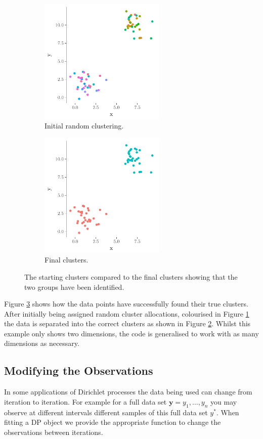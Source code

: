 \documentclass[nojss]{jss}
\begin{document}
\begin{figure}[tb]
	\begin{subfigure}[t]{0.5\textwidth}
	\includegraphics[height=60mm, width=60mm]{img/clustering_initial_plot.pdf}
	\caption{Initial random clustering.}
	\label{fig:clusteringA}
	\end{subfigure}
	\begin{subfigure}[t]{0.5\textwidth}
	\includegraphics[height=60mm, width=60mm]{img/clustering_fit_plot.pdf}
	\caption{Final clusters.}
		\label{fig:clusteringB}
	\end{subfigure}
	\caption{The starting clusters compared to the final clusters showing that the two groups have been identified.}
	\label{fig:clustering}
\end{figure}
Figure \ref{fig:clustering} shows how the data points have successfully found their true clusters. After initially being assigned random cluster allocations, colourised in Figure \ref{fig:clusteringA} the data is separated into the correct clusters as shown in Figure \ref{fig:clusteringB}. Whilst this example only shows two dimensions, the code is generalised to work with as many dimensions as necessary.


\subsection{Modifying the Observations}
In some applications of Dirichlet processes the data being used can change from iteration to iteration. For example for a full data set $\mathbf{y} = y_1 , \ldots , y_n$ you may observe at different intervals different samples of this full data set $y^*$. When fitting a DP object we provide the appropriate function  to change the observations between iterations.
\end{document}
